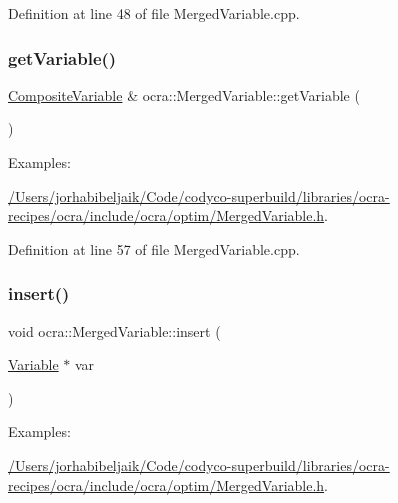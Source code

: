 Definition at line 48 of file Merged\+Variable.\+cpp.

\hypertarget{classocra_1_1MergedVariable_afa4986407c3fbaebe268fd248b2c4bcf}{}\label{classocra_1_1MergedVariable_afa4986407c3fbaebe268fd248b2c4bcf} 
\subsubsection{\texorpdfstring{get\+Variable()}{getVariable()}}
{\footnotesize\ttfamily \hyperlink{classocra_1_1CompositeVariable}{Composite\+Variable} \& ocra\+::\+Merged\+Variable\+::get\+Variable (\begin{DoxyParamCaption}{ }\end{DoxyParamCaption})}

\begin{Desc}
\item[Examples\+: ]\par
\hyperlink{_2Users_2jorhabibeljaik_2Code_2codyco-superbuild_2libraries_2ocra-recipes_2ocra_2include_2ocra_27dfe52ed2d2fe1904154f5be9150e8b1}{/\+Users/jorhabibeljaik/\+Code/codyco-\/superbuild/libraries/ocra-\/recipes/ocra/include/ocra/optim/\+Merged\+Variable.\+h}.\end{Desc}


Definition at line 57 of file Merged\+Variable.\+cpp.

\hypertarget{classocra_1_1MergedVariable_aa91f4ed9514c3dd4bf1ae4e25cf1e118}{}\label{classocra_1_1MergedVariable_aa91f4ed9514c3dd4bf1ae4e25cf1e118} 
\subsubsection{\texorpdfstring{insert()}{insert()}}
{\footnotesize\ttfamily void ocra\+::\+Merged\+Variable\+::insert (\begin{DoxyParamCaption}\item[{\hyperlink{classocra_1_1Variable}{Variable} $\ast$}]{var }\end{DoxyParamCaption})}

\begin{Desc}
\item[Examples\+: ]\par
\hyperlink{_2Users_2jorhabibeljaik_2Code_2codyco-superbuild_2libraries_2ocra-recipes_2ocra_2include_2ocra_27dfe52ed2d2fe1904154f5be9150e8b1}{/\+Users/jorhabibeljaik/\+Code/codyco-\/superbuild/libraries/ocra-\/recipes/ocra/include/ocra/optim/\+Merged\+Variable.\+h}.\end{Desc}


